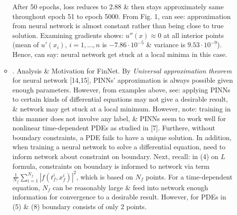 \documentclass{article}
\begin{document}
\begin{itemize}
\begin{itemize}
		After 50 epochs, loss reduces to 2.88 \& then stays approximately same throughout epoch 51 to epoch 5000. From {\sf Fig. 1}, can see: approximation from neural network is almost constant rather than being close to true solution. Examining gradients shows: $u''(x)\approx0$ at all interior points (mean of $u'(x_i)$, $i = 1,\ldots,n$ is $-7.86\cdot10^{-5}$ \& variance is $9.53\cdot10^{-9}$). Hence, can say: neural network get stuck at a local minima in this case.
		\item {. Analysis \& Motivation for FinNet.} By {\it Universal approximation theorem} for neural network [14,15], PINNs' approximation is always possible given enough parameters. However, from examples above, see: applying PINNs to certain kinds of differential equations may not give a desirable result, \& network may get stuck at a local minimum. However, note: training in this manner does not involve any label, \& PINNs seem to work well for nonlinear time-dependent PDEs as studied in [7]. Furthere, without boundary constraints, a PDE fails to have a unique solution. In addition, when training a neural network to solve a differential equation, need to inform network about constraint on boundary. Next, recall: in (4) on $L$ formula, constraints on boundary is informed to network via term $\frac{1}{N_f}\sum_{i=1}^{N_f} |f(t_f^i,x_f^i)|^2$, which is based on $N_f$ points. For a time-dependent equation, $N_f$ can be reasonably large \& feed into network enough information for convergence to a desirable result. However, for PDEs in (5) \& (8) boundary consists of only 2 points.
		

\end{itemize}
\end{itemize}
\end{document}
